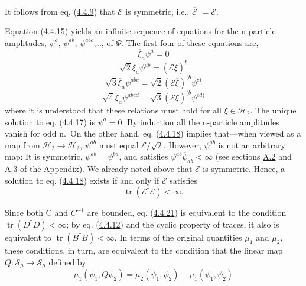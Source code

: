 \documentclass[11pt,a4paper]{article}
\begin{document}
It follows from eq. (\hyperref[eq:4.4.9]{4.4.9}) that \(\mathcal{E}\) is symmetric, i.e., \(\overline{\mathcal{E}}^{\dagger} = \mathcal{E}\).

Equation (\hyperref[eq:4.4.15]{4.4.15}) yields an infinite sequence of equations for the n-particle amplitudes, \(\psi^a\), \(\psi^{ab}\), \(\psi^{abc}\),\ldots, of \(\Psi\). The first four of these equations are,
\begin{equation*}
\overline{\xi}_a \psi^a = 0 \tag{4.4.17}\label{eq:4.4.17}
\end{equation*}
\begin{equation*}
\sqrt{2} \overline{\xi}_{a} \psi^{ab} = (\mathcal{E}\overline{\xi})^{b} \tag{4.4.18}\label{eq:4.4.18}
\end{equation*}
\begin{equation*}
\sqrt{3} \overline{\xi}_{a} \psi^{abc} = \sqrt{2} (\mathcal{E}\overline{\xi})^{(b} \psi^{c)} \tag{4.4.19}\label{eq:4.4.19}
\end{equation*}
\begin{equation*}
\sqrt{4} \overline{\xi}_{a} \psi^{abcd} = \sqrt{3} (\mathcal{E}\overline{\xi})^{(b} \psi^{cd)} \tag{4.4.20}\label{eq:4.4.20}
\end{equation*}
where it is understood that these relations must hold for all \(\xi \in \mathcal{H}_2\). The unique solution to eq. (\hyperref[eq:4.4.17]{4.4.17}) is \(\psi^a = 0\). By induction all the n-particle amplitudes vanish for odd n.~On the other hand, eq. (\hyperref[eq:4.4.18]{4.4.18}) implies that---when viewed as a map from \(\overline{\mathcal{H}}_2\to\mathcal{H}_2\), \(\psi^{ab}\) must equal \(\mathcal{E}/\sqrt{2}\). However, \(\psi^{ab}\) is not an arbitrary map: It is symmetric, \(\psi^{ab} = \psi^{ba}\), and satisfies \(\psi^{ab}\overline{\psi}_{ab}<\infty\) (see sections \hyperlink{sec:A.2}{A.2} and \hyperlink{sec:A.3}{A.3} of the Appendix). We already noted above that \(\mathcal{E}\) is symmetric. Hence, a solution to eq. (\hyperref[eq:4.4.18]{4.4.18}) exists if and only if \(\mathcal{E}\) satisfies
\begin{equation*}
\operatorname{tr}(\mathcal{E}^{\dagger}\mathcal{E}) < \infty. \tag{4.4.21}\label{eq:4.4.21}
\end{equation*}

Since both C and \(C^{-1}\) are bounded, eq. (\hyperref[eq:4.4.21]{4.4.21}) is equivalent to the condition \(\operatorname{tr}(D^{\dagger}D) < \infty\); by eq. (\hyperref[eq:4.4.12]{4.4.12}) and the cyclic property of traces, it also is equivalent to \(\operatorname{tr}(B^{\dagger}B) < \infty\). In terms of the original quantities \(\mu_1\) and \(\mu_2\), these conditions, in turn, are equivalent to the condition that the linear map \(Q: \mathcal{S}_\mu \to \mathcal{S}_\mu\) defined by
\begin{equation*}
\mu_1(\psi_1, Q\psi_2) = \mu_2(\psi_1, \psi_2) - \mu_1(\psi_1, \psi_2) \tag{4.4.22}\label{eq:4.4.22}
\end{equation*}
\end{document}
